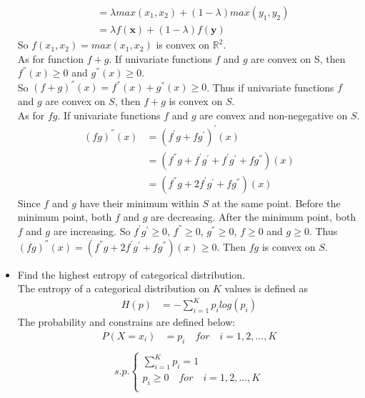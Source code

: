 \documentclass{article}
\begin{document}
\begin{itemize}
\begin{align*}
    &= \lambda max(x_{1}, x_{2}) + (1 - \lambda) max(y_{1}, y_{2})\\
    &= \lambda f(\bm{x}) + (1 - \lambda)f(\bm{y})
\end{align*}
So $f(x_{1}, x_{2}) = max(x_{1}, x_{2})$ is convex on $\mathbb{R}^2$.\\
As for function $f + g$. If univariate functions $f$ and $g$ are convex on S, then $ f^{''}(x) \geq 0$ and $ g^{''}(x)\geq 0$.\\
So $(f + g)^{''}(x) = f^{''}(x) + g^{''}(x) \geq 0$. Thus if univariate functions $f$ and $g$ are convex on $S$, then $f + g$ is convex on $S$.\\
As for $fg$. If univariate functions $f$ and $g$ are convex and non-negegative on $S$.
\begin{align*}
    (fg)^{''}(x) &= (f^{'}g + fg^{'})^{'}(x)\\
    &= (f^{''}g + f^{'}g^{'} + f^{'}g^{'} + fg^{''})(x)\\
    &= (f^{''}g + 2f^{'}g^{'} + f g^{''})(x)
\end{align*}
Since $f$ and $g$ have their minimum within $S$ at the same point. Before the minimum point, both $f$ and $g$ are decreasing. After the minimum point, both $f$ and $g$ are increasing. So $f^{'}g^{'} \geq 0$, $f^{''} \geq 0$, $g^{''} \geq 0$, $f\geq0$ and $g \geq 0$. Thus $(fg)^{''}(x) = (f^{''}g + 2f^{'}g^{'} + f g^{''})(x)\geq 0$. Then $fg$ is convex on $S$.\\
\item Find the highest entropy of categorical distribution.\\
The entropy of a categorical distribution on $K$ values is defined as\\
\begin{align*}
    H(p) &= -\sum_{i = 1}^K p_{i}log(p_{i})
\end{align*}
The probability and constrains are defined below:\\
\begin{align*}
    P(X = x_{i}) &= p_{i}\quad for\quad i = 1, 2, ..., K\\
\end{align*}
\begin{align*}
    s.p.\left\{
\begin{aligned}
\sum_{i = 1}^K p_{i} = 1\\
p_{i} \geq 0 \quad for\quad i = 1, 2, ..., K\\
\end{aligned}
\right.
\end{align*}

\end{itemize}
\end{document}
